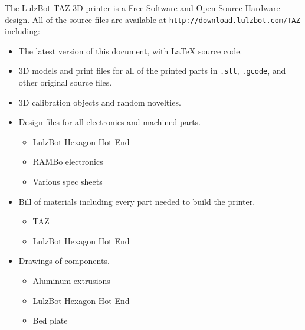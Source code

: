 %
%
%
%
%

The LulzBot TAZ 3D printer is a Free Software and Open Source Hardware design. All of the source files are available at \texttt{http://download.lulzbot.com/TAZ} including:

\begin{itemize}
\item The latest version of this document, with {\LaTeX} source code.

\item 3D models and print files for all of the printed parts in \texttt{.stl}, \texttt{.gcode}, and other original source files.

\item 3D calibration objects and random novelties.

\item Design files for all electronics and machined parts.

\begin{itemize} %
\item LulzBot Hexagon Hot End
\item RAMBo electronics
\item Various spec sheets
\end{itemize} %

\item Bill of materials including every part needed to build the printer.
\begin{itemize} %
\item TAZ
\item LulzBot Hexagon Hot End
\end{itemize} %

\item Drawings of components.
\begin{itemize} %
\item Aluminum extrusions
\item LulzBot Hexagon Hot End
\item Bed plate
\end{itemize} %


\end{itemize}

